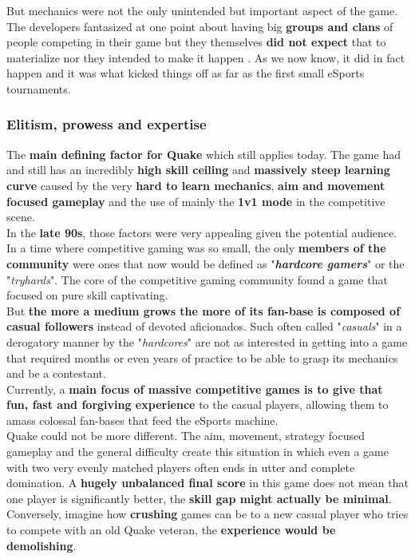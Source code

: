 But mechanics were not the only unintended but important aspect of the game. The developers fantasized at one point about having big \textbf{groups and clans} of people competing in their game but they themselves \textbf{did not expect} that to materialize nor they intended to make it happen \citep{clanHistory}. As we now know, it did in fact happen and it was what kicked things off as far as the first small eSports tournaments.

\subsubsection{Elitism, prowess and expertise}

The \textbf{main defining factor for Quake} which still applies today. The game had and still has an incredibly \textbf{high skill ceiling} and \textbf{massively steep learning curve} caused by the very \textbf{hard to learn mechanics}, \textbf{aim and movement focused gameplay} and the use of mainly the \textbf{1v1 mode} in the competitive scene.\\

In the \textbf{late 90s}, those factors were very appealing given the potential audience. In a time where competitive gaming was so small, the only \textbf{members of the community} were ones that now would be defined as "\textit{\textbf{hardcore gamers}}" or the "\textit{tryhards}". The core of the competitive gaming community found a game that focused on pure skill captivating.\\

But \textbf{the more a medium grows the more of its fan-base is composed of casual followers} instead of devoted aficionados. Such often called "\textit{casuals}" in a derogatory manner by the "\textit{hardcores}" are not as interested in getting into a game that required months or even years of practice to be able to grasp its mechanics and be a contestant.\\

Currently, a \textbf{main focus of massive competitive games is to give that fun, fast and forgiving experience} to the casual players, allowing them to amass colossal fan-bases that feed the eSports machine.\\

Quake could not be more different. The aim, movement, strategy focused gameplay and the general difficulty create this situation in which even a game with two very evenly matched players often ends in utter and complete domination. A \textbf{hugely unbalanced final score} in this game does not mean that one player is significantly better, the \textbf{skill gap might actually be minimal}. Conversely, imagine how \textbf{crushing} games can be to a new casual player who tries to compete with an old Quake veteran, the \textbf{experience would be demolishing}.\\

